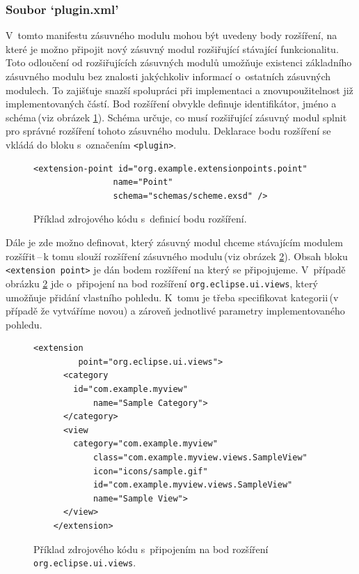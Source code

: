       \subsubsection{Soubor `plugin.xml'}
      V~tomto manifestu zásuvného modulu mohou být uvedeny body rozšíření, na které je možno připojit nový zásuvný modul rozšiřující stávající funkcionalitu. Toto odloučení od rozšiřujících zásuvných modulů umožňuje existenci základního zásuvného modulu bez znalosti jakýchkoliv informací o~ostatních zásuvných modulech. To zajišťuje snazší spolupráci při implementaci a znovupoužitelnost již implementovaných částí. Bod rozšíření obvykle definuje identifikátor, jméno a schéma\,(viz obrázek \ref{code:extension_point_declaration}). Schéma určuje, co musí rozšiřující zásuvný modul splnit pro správné rozšíření tohoto zásuvného modulu. Deklarace bodu rozšíření se vkládá do bloku s~označením \texttt{<plugin>}. 
      
      \lstset{language=xml}
      \begin{figure}
	\begin{lstlisting}[frame=single]
	  <extension-point id="org.example.extensionpoints.point"
                name="Point"
                schema="schemas/scheme.exsd" />
	\end{lstlisting}
	\caption{Příklad zdrojového kódu s~definicí bodu rozšíření.}
	\label{code:extension_point_declaration}
      \end{figure}
      
      Dále je zde možno definovat, který zásuvný modul chceme stávajícím modulem rozšířit\,--\,k tomu slouží rozšíření zásuvného modulu\,(viz obrázek \ref{code:extension_declaration}). Obsah bloku \texttt{<extension point>} je dán bodem rozšíření na který se připojujeme. V~případě obrázku \ref{code:extension_declaration} jde o~připojení na bod rozšíření \texttt{org.eclipse.ui.views}, který umožňuje přidání vlastního pohledu. K~tomu je třeba specifikovat kategorii\,(v případě že vytváříme novou) a zároveň jednotlivé parametry implementovaného pohledu.
      
      \begin{figure}
	\begin{lstlisting}[frame=single]
	  <extension
         point="org.eclipse.ui.views">
	  <category
	    id="com.example.myview"
            name="Sample Category">
	  </category>
	  <view
	    category="com.example.myview"
            class="com.example.myview.views.SampleView"
            icon="icons/sample.gif"
            id="com.example.myview.views.SampleView"
            name="Sample View">
	  </view>
	</extension>
	\end{lstlisting}
	\caption{Příklad zdrojového kódu s~připojením na bod rozšíření \texttt{org.eclipse.ui.views}.}
	\label{code:extension_declaration}
      \end{figure}